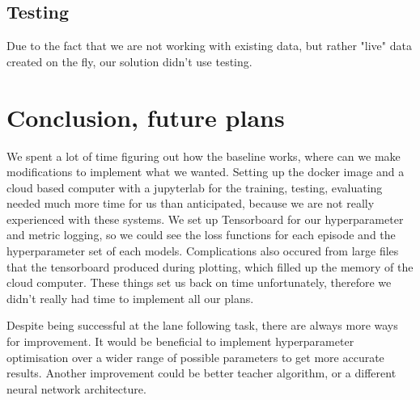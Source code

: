 \documentclass{article}
\begin{document}
\subsection{Testing}

Due to the fact that we are not working with existing data, but rather "live" data created on the fly, our solution didn't use testing.\\ 


\section{Conclusion, future plans}

We spent a lot of time figuring out how the baseline works, where can we make modifications to implement what we wanted. Setting up the docker image and a cloud based computer with a jupyterlab for the training, testing, evaluating needed much more time for us than anticipated, because we are not really experienced with these systems. We set up Tensorboard for our hyperparameter and metric logging, so we could see the loss functions for each episode and the hyperparameter set of each models. Complications also occured from large files that the tensorboard produced during plotting, which filled up the memory of the cloud computer.
These things set us back on time unfortunately, therefore we didn't really had time to implement all our plans.


Despite being successful at the lane following task, there are always more ways for improvement. It would be beneficial to implement hyperparameter optimisation over a wider range of possible parameters to get more accurate results. Another improvement could be better teacher algorithm, or a different neural network architecture. 






\medskip

\small



\end{document}
